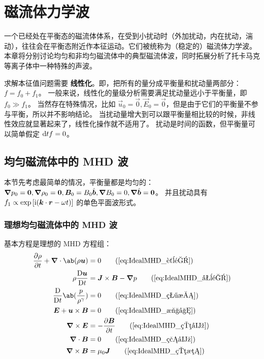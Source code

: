 
\chapter{磁流体力学波}

一个已经处在平衡态的磁流体体系，在受到小扰动时（外加扰动，内在扰动，湍动），往往会在平衡态附近作本征运动。它们被统称为（稳定的）磁流体力学波。本章将分别讨论均匀和非均匀磁流体中的典型磁流体波，同时拓展分析了托卡马克等离子体中一种特殊的声波。

求解本征值问题需要 \textbf{线性化}。即，把所有的量分成平衡量和扰动量两部分：$ f = f_0 + f_1 $。
一般来说，线性化的量级分析需要满足扰动量远小于平衡量，即 $f_0 \gg f_1$。
当然存在特殊情况，比如 $ \vec{u}_0 = \vec{0}, \vec{E}_0 = \vec{0} $，但是由于它们的平衡量不参与平衡，所以并不影响结论。
当扰动量增大到可以跟平衡量相比较的时候，非线性效应就显著起来了，线性化操作就不适用了。
扰动是时间的函数，但平衡量可以简单假定 $ \odv{f}!{t} = 0 $。

\section{均匀磁流体中的 MHD 波}

本节先考虑最简单的情况，平衡量都是均匀的：
$ \bm{\nabla}{p_0} = \bm{0}, \bm{\nabla}{\rho_0} = \bm{0}, \bm{B}_0 = B_0 \hat{\bm{b}}, \bm{\nabla}{B_0} = 0, \bm{\nabla}{\hat{\bm{b}}} = \bm{0} $。
并且扰动具有
$ f_1 \propto \exp{[\mathrm{i}(\bm{k} \cdot \bm{r} - \omega t)]} $ 的单色平面波形式。

\subsection{理想均匀磁流体中的 MHD 波}

基本方程是理想的 MHD 方程组：
\begin{align}
\pdv{\rho}{t} + \dive{\ab(\rho \vec{u})} &= 0
\tag{\ref{eq:IdealMHD_质量}} \\
\rho \mdv{\vec{u}}{t} &= \vec{J} \times \vec{B} - \grad{p}
\tag{\ref{eq:IdealMHD_动量}} \\
\mdv{}{t} \ab(\frac{p}{\rho^\gamma}) &= 0
\tag{\ref{eq:IdealMHD_状态}} \\
\vec{E} + \vec{u} \times \vec{B} &= 0
\tag{\ref{eq:IdealMHD_欧姆}} \\
\curl{\vec{E}} &= - \pdv{\vec{B}}{t}
\tag{\ref{eq:IdealMHD_电场}} \\
\dive{\vec{B}} &= 0
\tag{\ref{eq:IdealMHD_磁场}} \\
\curl{\vec{B}} &= \mu_0 \vec{J}
\tag{\ref{eq:IdealMHD_电流}}
\end{align}

